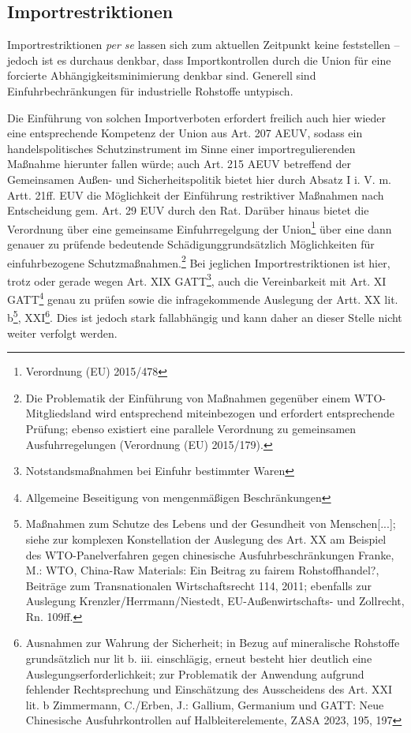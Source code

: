 \documentclass[12pt,a4paper,oneside]{book} %
\begin{document}
{	
	\subsection{Importrestriktionen}
	Importrestriktionen \textit{per se} lassen sich zum aktuellen Zeitpunkt keine feststellen -- jedoch ist es durchaus denkbar, dass Importkontrollen durch die Union für eine forcierte Abhängigkeitsminimierung denkbar sind. Generell sind Einfuhrbechränkungen für industrielle Rohstoffe untypisch.\autocite{Schorkopf, Rohstoffverwaltung, Rn. 37}
	
	Die Einführung von solchen Importverboten erfordert freilich auch hier wieder eine entsprechende Kompetenz der Union aus Art. 207 AEUV, sodass ein handelspolitisches Schutzinstrument im Sinne einer importregulierenden Maßnahme hierunter fallen würde; auch Art. 215 AEUV betreffend der Gemeinsamen Außen- und Sicherheitspolitik bietet hier durch Absatz I i. V. m. Artt. 21ff. EUV die Möglichkeit der Einführung restriktiver Maßnahmen nach Entscheidung gem. Art. 29 EUV durch den Rat. Darüber hinaus bietet die Verordnung über eine gemeinsame Einfuhrregelgung der Union\footnote{Verordnung (EU) 2015/478} über eine dann genauer zu prüfende \glqq bedeutende Schädigung\grqq grundsätzlich Möglichkeiten für einfuhrbezogene Schutzmaßnahmen.\footnote{Die Problematik der Einführung von Maßnahmen gegenüber einem WTO-Mitgliedsland wird entsprechend miteinbezogen und erfordert entsprechende Prüfung; ebenso existiert eine parallele Verordnung zu gemeinsamen Ausfuhrregelungen (Verordnung (EU) 2015/179).} Bei jeglichen Importrestriktionen ist hier, trotz oder gerade wegen Art. XIX GATT\footnote{Notstandsmaßnahmen bei Einfuhr bestimmter Waren}, auch die Vereinbarkeit mit Art. XI GATT\footnote{Allgemeine Beseitigung von mengenmäßigen Beschränkungen} genau zu prüfen sowie die infragekommende Auslegung der Artt. XX lit. b\footnote{Maßnahmen zum Schutze des Lebens und der Gesundheit von Menschen[...]; siehe zur komplexen Konstellation der Auslegung des Art. XX am Beispiel des WTO-Panelverfahren gegen chinesische Ausfuhrbeschränkungen Franke, M.: WTO, China-Raw Materials: Ein Beitrag zu fairem Rohstoffhandel?, Beiträge zum Transnationalen Wirtschaftsrecht 114, 2011; ebenfalls zur Auslegung Krenzler/Herrmann/Niestedt, EU-Außenwirtschafts- und Zollrecht, Rn. 109ff.}, XXI\footnote{Ausnahmen zur Wahrung der Sicherheit; in Bezug auf mineralische Rohstoffe grundsätzlich nur lit b. iii. einschlägig, erneut besteht hier deutlich eine Auslegungserforderlichkeit; zur Problematik der Anwendung aufgrund fehlender Rechtsprechung und Einschätzung des Ausscheidens des Art. XXI lit. b Zimmermann, C./Erben, J.: Gallium, Germanium und GATT: Neue Chinesische Ausfuhrkontrollen auf Halbleiterelemente, ZASA 2023, 195, 197}. Dies ist jedoch stark fallabhängig und kann daher an dieser Stelle nicht weiter verfolgt werden.
	
}
\end{document}
